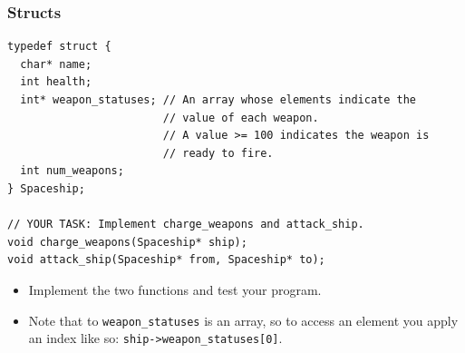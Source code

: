 \documentclass[pdf]{beamer}
\begin{document}
\begin{frame}[fragile]
  \frametitle{Structs}

\begin{verbatim}
typedef struct {
  char* name;
  int health;
  int* weapon_statuses; // An array whose elements indicate the
                        // value of each weapon.
                        // A value >= 100 indicates the weapon is
                        // ready to fire.
  int num_weapons;
} Spaceship;

// YOUR TASK: Implement charge_weapons and attack_ship.
void charge_weapons(Spaceship* ship);
void attack_ship(Spaceship* from, Spaceship* to);
\end{verbatim}

  \bigskip

  \begin{itemize}
  \item Implement the two functions and test your program.
  \item Note that to \texttt{weapon_statuses} is an array, so to access an
    element you apply an index like so: \texttt{ship->weapon_statuses[0]}.
  \end{itemize}

\end{frame}
\end{document}
